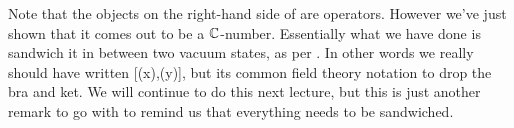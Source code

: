 \br 
    Note that the objects on the right-hand side of  are operators. However we've just shown that it comes out to be a $\mathbb{C}$-number. Essentially what we have done is sandwich it in between two vacuum states, as per . In other words we really should have written 
    \bse 
        [\phi(x),\phi(y)],
    \ese 
    but its common field theory notation to drop the bra and ket. We will continue to do this next lecture, but this is just another remark to go with  to remind us that everything needs to be sandwiched. 
\er 